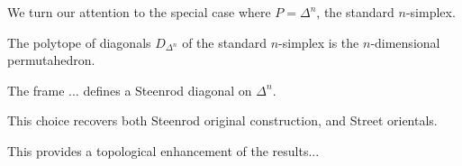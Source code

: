 
We turn our attention to the special case where $P=\Delta^n$, the standard $n$-simplex. 

\begin{lemma}
	The polytope of diagonals $D_{\Delta^n}$ of the standard $n$-simplex is the $n$-dimensional permutahedron. 
\end{lemma}

\begin{lemma}
	The frame ... defines a Steenrod diagonal on $\Delta^n$. 
\end{lemma}

\begin{theorem}
	This choice recovers both Steenrod original construction, and Street orientals. 
\end{theorem}

This provides a topological enhancement of the results...




